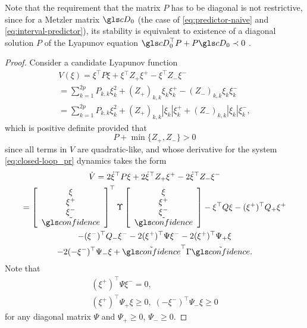 Note that the requirement that the matrix $P$ has to be diagonal is not
restrictive, since for a Metzler matrix $\cD_{0}$ (the case of \eqref{eq:predictor-naive}
and \eqref{eq:interval-predictor}), its stability is equivalent to
existence of a diagonal solution $P$ of the Lyapunov equation $\cD_{0}^{\top}P+P\cD_{0}\prec0$
\citep{FarinaRinaldi2000}.
\begin{proof}
	Consider a candidate Lyapunov function
	\begin{gather*}
	V(\xi)=\xi^{\top}P\xi+\xi{}^{\top}Z_{+}\xi^{+}-\xi^{\top}Z_{-}\xi^{-}\\
	=\sum_{k=1}^{2p}P_{k,k}\xi_{k}^{2}+(Z_{+})_{k,k}\xi_{k}\xi_{k}^{+}-(Z_{-})_{k,k}\xi_{k}\xi_{k}^{-}\\
	=\sum_{k=1}^{2p}P_{k,k}\xi_{k}^{2}+(Z_{+})_{k,k}|\xi_{k}|\xi_{k}^{+}+(Z_{-})_{k,k}|\xi_{k}|\xi_{k}^{-},
	\end{gather*}
	which is positive definite provided that
	\[
	P+\min\{Z_{+},Z_{-}\}>0
	\]
	since all terms in $V$ are quadratic-like, and whose derivative for
	the system \eqref{eq:closed-loop_pr} dynamics takes the form
	\begin{gather*}
	\dot{V}=2\dot{\xi}^{\top}P\xi+2\dot{\xi}^{\top}Z_{+}\xi^{+}-2\dot{\xi}^{\top}Z_{-}\xi^{-}\\
	=\left[\begin{array}{c}
	\xi\\
	\xi^{+}\\
	\xi^{-}\\
	\tilde{\confidence}
	\end{array}\right]^{\top}\Upsilon\left[\begin{array}{c}
	\xi\\
	\xi^{+}\\
	\xi^{-}\\
	\tilde{\confidence}
	\end{array}\right]-\xi^{\top}Q\xi-(\xi^{+})^{\top}Q_{+}\xi^{+}\\
	-(\xi^{-})^{\top}Q_{-}\xi^{-}-2(\xi^{+})^{\top}\Psi\xi^{-}-2(\xi^{+})^{\top}\Psi_{+}\xi\\
	-2(-\xi^{-})^{\top}\Psi_{-}\xi+\tilde{\confidence}^{\top}\Gamma\tilde{\confidence}.
	\end{gather*}
	Note that
	\begin{gather*}
	(\xi^{+})^{\top}\Psi\xi^{-}=0,\\
	(\xi^{+})^{\top}\Psi_{+}\xi\geq0,\;(-\xi^{-})^{\top}\Psi_{-}\xi\geq0
	\end{gather*}
	for any diagonal matrix $\Psi$ and $\Psi_{+}\geq0$, $\Psi_{-}\geq0$.

\end{proof}
